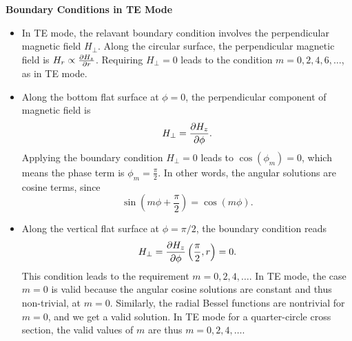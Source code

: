 \documentclass[11pt, a4paper]{article}
\begin{document}
\textbf{Boundary Conditions in TE Mode}
\begin{itemize}
    \item In TE mode, the relavant boundary condition involves the perpendicular magnetic field $ H_{\perp} $. Along the circular surface, the perpendicular magnetic field is $ H_{r} \propto \pdv{H_{z}}{r} $. Requiring $ H_{\perp} = 0 $ leads to the condition $ m = 0, 2, 4, 6, \ldots $, as in TE mode.
	
    \item Along the bottom flat surface at $ \phi = 0 $, the perpendicular component of magnetic field is
	\begin{equation*}
		H_{\perp} = \pdv{H_{z}}{\phi} (\phi = 0, r). 
	\end{equation*} 
    Applying the boundary condition $ H_{\perp} = 0 $ leads to $ \cos(\phi_{m}) = 0 $, which means the phase term is $ \phi_{m} = \frac{\pi}{2}  $. In other words, the angular solutions are cosine terms, since 
    \begin{equation*}
        \sin\left(m\phi + \frac{\pi}{2}\right) = \cos(m \phi).
    \end{equation*}
    
    \item Along the vertical flat surface at $ \phi = \pi/2 $, the boundary condition reads
	\begin{equation*}
		H_{\perp} = \pdv{H_{z}}{\phi}\left(\frac{\pi}{2}, r\right) = 0.
	\end{equation*}
    This condition leads to the requirement $ m = 0, 2, 4, \ldots $. In TE mode, the case $ m = 0 $ is valid because the angular cosine solutions are constant and thus non-trivial, at $ m = 0 $. Similarly, the radial Bessel functions are nontrivial for $ m = 0 $, and we get a valid solution. In TE mode for a quarter-circle cross section, the valid values of $ m $ are thus $ m = 0, 2, 4, \ldots $.
	
\end{itemize}
\end{document}
